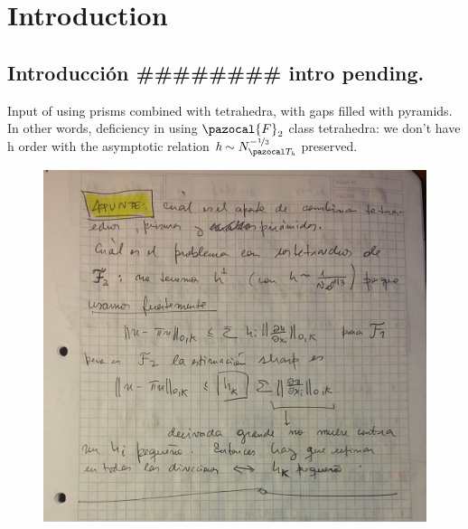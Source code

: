 \chapter{Introduction}
\section{Introducci\'on {\color{Orange}\#\#\#\#\#\#\#\# intro pending.}} %
Input of using prisms combined with tetrahedra, with gaps filled with pyramids.
In other words, deficiency in using $\pazocal{F}_2$ class tetrahedra: we don't
have $\textit{h}$ order with the asymptotic relation 
$\textit{h}\sim N_{\Th}^{-\nicefrac13}$ preserved.
\begin{figure}
  \centering
  \includegraphics[scale=.28]{./figures/motiv.png}
\end{figure}
